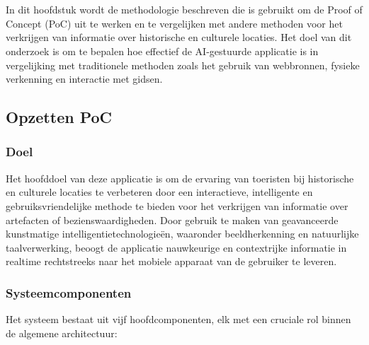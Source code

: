 
\chapter{}%
\label{ch:methodologie}



In dit hoofdstuk wordt de methodologie beschreven die is gebruikt om de Proof of Concept (PoC) uit te werken en te vergelijken met andere methoden voor het verkrijgen van informatie over historische en culturele locaties. Het doel van dit onderzoek is om te bepalen hoe effectief de AI-gestuurde applicatie is in vergelijking met traditionele methoden zoals het gebruik van webbronnen, fysieke verkenning en interactie met gidsen.

\section{Opzetten PoC}

\subsection{Doel}
Het hoofddoel van deze applicatie is om de ervaring van toeristen bij historische en culturele locaties te verbeteren door een interactieve, intelligente en gebruiksvriendelijke methode te bieden voor het verkrijgen van informatie over artefacten of bezienswaardigheden. Door gebruik te maken van geavanceerde kunstmatige intelligentietechnologieën, waaronder beeldherkenning en natuurlijke taalverwerking, beoogt de applicatie nauwkeurige en contextrijke informatie in realtime rechtstreeks naar het mobiele apparaat van de gebruiker te leveren.

\subsection{Systeemcomponenten}
Het systeem bestaat uit vijf hoofdcomponenten, elk met een cruciale rol binnen de algemene architectuur:

